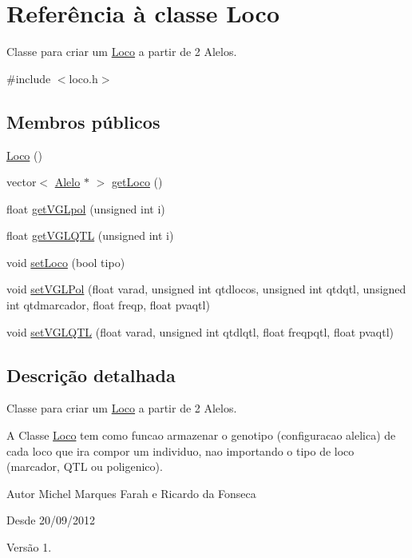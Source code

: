 \hypertarget{class_loco}{\section{\-Referência à classe \-Loco}
\label{class_loco}
}


\-Classe para criar um \hyperlink{class_loco}{\-Loco} a partir de 2 \-Alelos.  




{\ttfamily \#include $<$loco.\-h$>$}

\subsection*{\-Membros públicos}
\begin{DoxyCompactItemize}
\item 
\hyperlink{class_loco_ac76b405e7b9a8b427f13c92e21dbb749}{\-Loco} ()
\item 
vector$<$ \hyperlink{class_alelo}{\-Alelo} $\ast$ $>$ \hyperlink{class_loco_a710976ac6340a8a4eae1509ddb622f99}{get\-Loco} ()
\item 
float \hyperlink{class_loco_a2f83ae2640e39e14a994d244f3878029}{get\-V\-G\-Lpol} (unsigned int i)
\item 
float \hyperlink{class_loco_a110a570e49a0007ffc6dc5a4269a11aa}{get\-V\-G\-L\-Q\-T\-L} (unsigned int i)
\item 
void \hyperlink{class_loco_a17e42d11b5d0f86797f942742c476f04}{set\-Loco} (bool tipo)
\item 
void \hyperlink{class_loco_a350c5bd93d8ca9d4f312555e27891bf4}{set\-V\-G\-L\-Pol} (float varad, unsigned int qtdlocos, unsigned int qtdqtl, unsigned int qtdmarcador, float freqp, float pvaqtl)
\item 
void \hyperlink{class_loco_a0a3371328be88138be0386897264931e}{set\-V\-G\-L\-Q\-T\-L} (float varad, unsigned int qtdlqtl, float freqpqtl, float pvaqtl)
\end{DoxyCompactItemize}


\subsection{\-Descrição detalhada}
\-Classe para criar um \hyperlink{class_loco}{\-Loco} a partir de 2 \-Alelos. 

\-A \-Classe \hyperlink{class_loco}{\-Loco} tem como funcao armazenar o genotipo (configuracao alelica) de cada loco que ira compor um individuo, nao importando o tipo de loco (marcador, \-Q\-T\-L ou poligenico). \begin{DoxyAuthor}{\-Autor}
\-Michel \-Marques \-Farah e \-Ricardo da \-Fonseca 
\end{DoxyAuthor}
\begin{DoxySince}{\-Desde}
20/09/2012 
\end{DoxySince}
\begin{DoxyVersion}{\-Versão}
1. 
\end{DoxyVersion}


